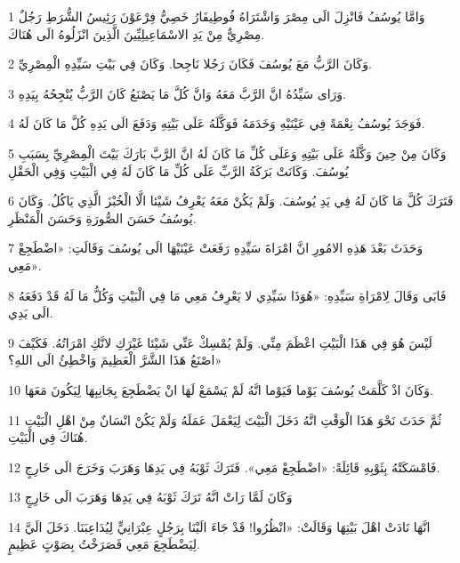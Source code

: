 \par 1 وَامَّا يُوسُفُ فَانْزِلَ الَى مِصْرَ وَاشْتَرَاهُ فُوطِيفَارُ خَصِيُّ فِرْعَوْنَ رَئِيسُ الشُّرَطِ رَجُلٌ مِصْرِيٌّ مِنْ يَدِ الاسْمَاعِيلِيِّينَ الَّذِينَ انْزَلُوهُ الَى هُنَاكَ.
\par 2 وَكَانَ الرَّبُّ مَعَ يُوسُفَ فَكَانَ رَجُلا نَاجِحا. وَكَانَ فِي بَيْتِ سَيِّدِهِ الْمِصْرِيِّ.
\par 3 وَرَاى سَيِّدُهُ انَّ الرَّبَّ مَعَهُ وَانَّ كُلَّ مَا يَصْنَعُ كَانَ الرَّبُّ يُنْجِحُهُ بِيَدِهِ.
\par 4 فَوَجَدَ يُوسُفُ نِعْمَةً فِي عَيْنَيْهِ وَخَدَمَهُ فَوَكَّلَهُ عَلَى بَيْتِهِ وَدَفَعَ الَى يَدِهِ كُلَّ مَا كَانَ لَهُ.
\par 5 وَكَانَ مِنْ حِينَ وَكَّلَهُ عَلَى بَيْتِهِ وَعَلَى كُلِّ مَا كَانَ لَهُ انَّ الرَّبَّ بَارَكَ بَيْتَ الْمِصْرِيِّ بِسَبَبِ يُوسُفَ. وَكَانَتْ بَرَكَةُ الرَّبِّ عَلَى كُلِّ مَا كَانَ لَهُ فِي الْبَيْتِ وَفِي الْحَقْلِ
\par 6 فَتَرَكَ كُلَّ مَا كَانَ لَهُ فِي يَدِ يُوسُفَ. وَلَمْ يَكُنْ مَعَهُ يَعْرِفُ شَيْئا الَّا الْخُبْزَ الَّذِي يَاكُلُ. وَكَانَ يُوسُفُ حَسَنَ الصُّورَةِ وَحَسَنَ الْمَنْظَرِ.
\par 7 وَحَدَثَ بَعْدَ هَذِهِ الامُورِ انَّ امْرَاةَ سَيِّدِهِ رَفَعَتْ عَيْنَيْهَا الَى يُوسُفَ وَقَالَتِ: «اضْطَجِعْ مَعِي».
\par 8 فَابَى وَقَالَ لِامْرَاةِ سَيِّدِهِ: «هُوَذَا سَيِّدِي لا يَعْرِفُ مَعِي مَا فِي الْبَيْتِ وَكُلُّ مَا لَهُ قَدْ دَفَعَهُ الَى يَدِي.
\par 9 لَيْسَ هُوَ فِي هَذَا الْبَيْتِ اعْظَمَ مِنِّي. وَلَمْ يُمْسِكْ عَنِّي شَيْئا غَيْرَكِ لانَّكِ امْرَاتُهُ. فَكَيْفَ اصْنَعُ هَذَا الشَّرَّ الْعَظِيمَ وَاخْطِئُ الَى اللهِ؟»
\par 10 وَكَانَ اذْ كَلَّمَتْ يُوسُفَ يَوْما فَيَوْما انَّهُ لَمْ يَسْمَعْ لَهَا انْ يَضْطَجِعَ بِجَانِبِهَا لِيَكُونَ مَعَهَا.
\par 11 ثُمَّ حَدَثَ نَحْوَ هَذَا الْوَقْتِ انَّهُ دَخَلَ الْبَيْتَ لِيَعْمَلَ عَمَلَهُ وَلَمْ يَكُنْ انْسَانٌ مِنْ اهْلِ الْبَيْتِ هُنَاكَ فِي الْبَيْتِ.
\par 12 فَامْسَكَتْهُ بِثَوْبِهِ قَائِلَةً: «اضْطَجِعْ مَعِي». فَتَرَكَ ثَوْبَهُ فِي يَدِهَا وَهَرَبَ وَخَرَجَ الَى خَارِجٍ.
\par 13 وَكَانَ لَمَّا رَاتْ انَّهُ تَرَكَ ثَوْبَهُ فِي يَدِهَا وَهَرَبَ الَى خَارِجٍ
\par 14 انَّهَا نَادَتْ اهْلَ بَيْتِهَا وَقَالَتْ: «انْظُرُوا! قَدْ جَاءَ الَيْنَا بِرَجُلٍ عِبْرَانِيٍّ لِيُدَاعِبَنَا. دَخَلَ الَيَّ لِيَضْطَجِعَ مَعِي فَصَرَخْتُ بِصَوْتٍ عَظِيمٍ.

